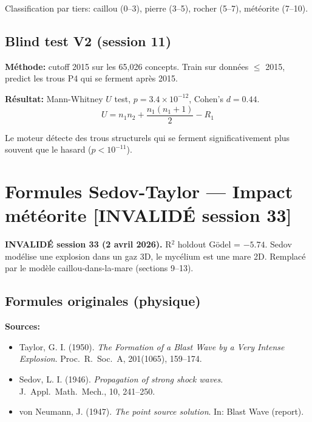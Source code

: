 \documentclass[11pt,a4paper]{article}
\begin{document}
Classification par tiers: caillou (0--3), pierre (3--5), rocher (5--7), m\'et\'eorite (7--10).

\subsection{Blind test V2 (session 11)}

\textbf{M\'ethode:} cutoff 2015 sur les 65,026 concepts. Train sur donn\'ees $\leq$ 2015,
predict les trous P4 qui se ferment apr\`es 2015.

\textbf{R\'esultat:} Mann-Whitney $U$ test, $p = 3.4 \times 10^{-12}$, Cohen's $d = 0.44$.
\begin{equation}
U = n_1 n_2 + \frac{n_1(n_1 + 1)}{2} - R_1
\end{equation}

Le moteur d\'etecte des trous structurels qui se ferment significativement plus
souvent que le hasard ($p < 10^{-11}$).

\section{Formules Sedov-Taylor --- Impact m\'et\'eorite [INVALID\'E session 33]}

\textbf{INVALID\'E session 33 (2 avril 2026).}
R$^2$ holdout G\"odel = $-5.74$. Sedov mod\'elise une explosion dans un gaz 3D,
le myc\'elium est une mare 2D. Remplac\'e par le mod\`ele caillou-dans-la-mare
(sections 9--13).

\subsection{Formules originales (physique)}

\textbf{Sources:}
\begin{itemize}
\item Taylor, G. I. (1950). \textit{The Formation of a Blast Wave by a Very Intense Explosion}.
Proc.\ R.\ Soc.\ A, 201(1065), 159--174.
\item Sedov, L. I. (1946). \textit{Propagation of strong shock waves}.
J.\ Appl.\ Math.\ Mech., 10, 241--250.
\item von Neumann, J. (1947). \textit{The point source solution}. In: Blast Wave (report).
\end{itemize}
\end{document}
